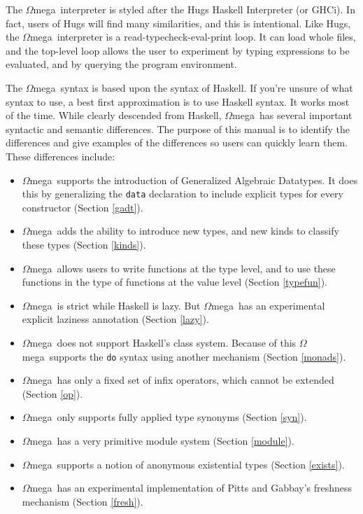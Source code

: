 \documentclass[11pt,twoside]{article}
\newcommand{\om}{$\Omega$mega}
\begin{document}
The \om\ interpreter is styled after the Hugs Haskell Interpreter (or GHCi). In
fact, users of Hugs will find many similarities, and this is intentional. Like
Hugs, the \om\ interpreter is a read-typecheck-eval-print loop. It can load
whole files, and the top-level loop allows the user to experiment by typing
expressions to be evaluated, and by querying the program environment.

The \om\ syntax is based upon the syntax of Haskell. If you're unsure
of what syntax to use, a best first approximation is to use Haskell
syntax. It works most of the time. While clearly descended from Haskell,
\om\ has several important syntactic and semantic differences. The
purpose of this manual is to identify the differences and give
examples of the differences so users can quickly learn them. These
differences include:

\begin{itemize}

\item \om\ supports the introduction of Generalized Algebraic Datatypes.
It does this by generalizing the {\tt data} declaration to
include explicit types for every constructor (Section \ref{gadt}).

\item \om\ adds the ability to introduce new types, and new kinds to
classify these types (Section \ref{kinds}).

\item \om\ allows users to write functions at the type level, and to use these
functions in the type of functions at the value level (Section \ref{typefun}).

\item \om\ is strict while Haskell is lazy. But \om\ has an experimental
explicit laziness annotation (Section \ref{lazy}).

\item \om\ does not support Haskell's class system. Because of this
\om\ supports the {\tt do} syntax using another mechanism (Section \ref{monads}).

\item \om\ has only a fixed set of infix operators, which cannot be extended (Section \ref{op}).

\item \om\ only supports fully applied type synonyms (Section \ref{syn}).

\item \om\ has a very primitive module system (Section \ref{module}).

\item \om\ supports a notion of anonymous existential types (Section \ref{exists}).

\item \om\ has an experimental implementation of Pitts and Gabbay's freshness
mechanism (Section \ref{fresh}).

\end{itemize}
\end{document}
